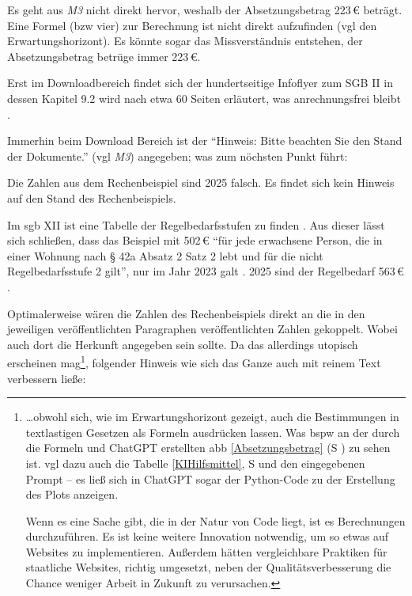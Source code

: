 \begin{myenumerate}
    \item Es geht aus \emph{M3} nicht direkt hervor, weshalb der Absetzungsbetrag 223\,€ beträgt. %
    Eine Formel (\gls{bzw} vier) zur Berechnung ist nicht direkt aufzufinden (\gls{vgl} den Erwartungshorizont). 
    Es könnte sogar das Missverständnis entstehen, der Absetzungsbetrag betrüge immer 223\,€.
    
    Erst im Downloadbereich findet sich der hundertseitige Infoflyer zum SGB II in dessen Kapitel 9.2 wird nach etwa 60 Seiten %
    erläutert, was anrechnungsfrei bleibt \autocite[59-62]{MerkblattSGBII}. 
    
    Immerhin beim Download Bereich ist der \enquote{Hinweis: Bitte beachten Sie den Stand der Dokumente.} (\gls{vgl} \emph{M3}) angegeben; was zum nöchsten Punkt führt:
    \item Die Zahlen aus dem Rechenbeispiel sind 2025 falsch. Es findet sich kein Hinweis auf den Stand des Rechenbeispiels.
    
    Im \gls{sgb} XII ist eine Tabelle der Regelbedarfsstufen zu finden \autocite[Anlage zu §28]{Bundestag.2003}. Aus dieser lässt sich schließen, dass das Beispiel mit 502\,€ \enquote{für jede erwachsene Person, die in einer Wohnung nach § 42a Absatz 2 Satz 2 lebt und für die nicht Regelbedarfsstufe 2 gilt}, nur im Jahr 2023 galt \autocite[Anlage zu §28]{Bundestag.2003}. 2025 sind der Regelbedarf 563\,€ \autocite[Anlage zu §28]{Bundestag.2003}.

    Optimalerweise wären die Zahlen des Rechenbeispiels direkt an die in den jeweiligen veröffentlichten Paragraphen veröffentlichten Zahlen gekoppelt. Wobei auch dort die Herkunft angegeben sein sollte. Da das allerdings utopisch erscheinen mag\footnote{
        \dots obwohl sich, wie im Erwartungshorizont gezeigt, auch die Bestimmungen in textlastigen Gesetzen als Formeln ausdrücken lassen. Was \gls{bspw} an der durch die Formeln und ChatGPT erstellten \gls{abb} \ref{Absetzungsbetrag} (\gls{S} \pageref{Absetzungsbetrag}) zu sehen ist. \Gls{vgl} dazu auch die Tabelle \ref{KIHilfsmittel}, \gls{S} \pageref{KIHilfsmittel} und den eingegebenen Prompt -- es ließ sich in ChatGPT sogar der Python-Code zu der Erstellung des Plots anzeigen. 
        
        Wenn es eine Sache gibt, die in der Natur von Code liegt, ist es Berechnungen durchzuführen. Es ist keine weitere Innovation notwendig, um so etwas auf Websites zu implementieren. Außerdem hätten vergleichbare Praktiken für staatliche Websites, richtig umgesetzt, neben der Qualitätsverbesserung die Chance weniger Arbeit in Zukunft zu verursachen. 
    }, folgender Hinweis wie sich das Ganze auch mit reinem Text verbessern ließe:
    

\end{myenumerate}
